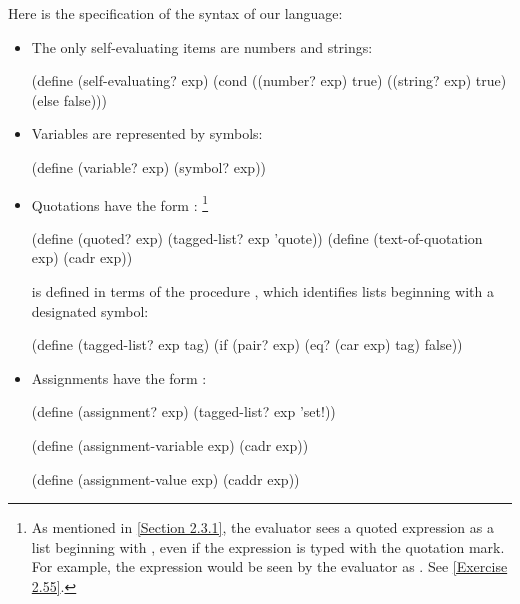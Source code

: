 Here is the specification of the syntax of our language:
\begin{itemize}[leftmargin=*]

	\item
		The only self-evaluating items are numbers and strings:

		\begin{scheme}
		  (define (self-evaluating? exp)
		    (cond ((number? exp) true)
		          ((string? exp) true)
		          (else false)))
		\end{scheme}

	\item
		Variables are represented by symbols:

		\begin{scheme}
		  (define (variable? exp) (symbol? exp))
		\end{scheme}

	\item
		Quotations have the form :%
		\footnote{
			As mentioned in \cref{Section 2.3.1}, the evaluator sees a quoted expression as a list beginning with , even if the expression is typed with the quotation mark.
			For example, the expression  would be seen by the evaluator as .
		See \cref{Exercise 2.55}.
		}
		\begin{scheme}
		  (define (quoted? exp) (tagged-list? exp 'quote))
		  (define (text-of-quotation exp) (cadr exp))
		\end{scheme}
		 is defined in terms of the procedure , which identifies lists beginning with a designated symbol:
		\begin{scheme}
		  (define (tagged-list? exp tag)
		    (if (pair? exp)
		        (eq? (car exp) tag)
		        false))
		\end{scheme}

	\item
		Assignments have the form :

		\begin{scheme}
		  (define (assignment? exp) (tagged-list? exp 'set!))

		  (define (assignment-variable exp) (cadr exp))

		  (define (assignment-value exp) (caddr exp))
		\end{scheme}


\end{itemize}
